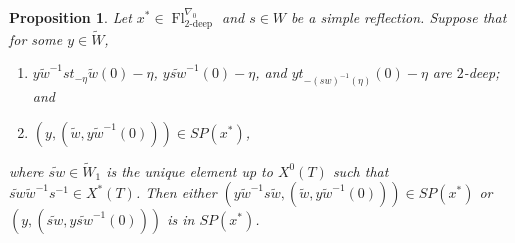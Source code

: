 \documentclass[oneside,a4paper,english, 11pt]{amsart}
\theoremstyle{plain}
\theoremstyle{plain}
\newtheorem{prop}[thm]{Proposition}
\theoremstyle{plain}
\theoremstyle{plain}
\theoremstyle{plain}
\theoremstyle{plain}
\theoremstyle{definition}
\theoremstyle{definition}
\theoremstyle{definition}
\theoremstyle{remark}
\numberwithin{equation}{section}
\newcommand{\tld}[1]{\widetilde{#1}}
\DeclareMathOperator{\Fl}{Fl}
\begin{document}
\begin{prop}\label{prop:walk}
Let $x^*\in \Fl_{2\textrm{-deep}}^{\nabla_0}$ and $s \in W$ be a simple reflection. 
Suppose that for some $y\in \tld{W}$, 
\begin{enumerate}
\item \label{item:2-deep} $y \tld{w}^{-1}s t_{-\eta} \tld{w}(0)-\eta$, $y \tld{sw}^{-1}(0)-\eta$, and $y t_{-(sw)^{-1}(\eta)}(0)-\eta$ are $2$-deep; and 
\item $(y,(\tld{w},y\tld{w}^{-1}(0))) \in SP(x^*)$, 
\end{enumerate}
where $\tld{sw} \in \tld{W}_1$ is the unique element up to $X^0(T)$ such that $\tld{sw}\tld{w}^{-1}s^{-1} \in X^*(T)$. 
Then either $(y\tld{w}^{-1}s\tld{w},(\tld{w},y\tld{w}^{-1}(0))) \in SP(x^*)$ or $(y,(\tld{sw},y\tld{sw}^{-1}(0)))$ is in $SP(x^*)$. 
\end{prop}
\end{document}
